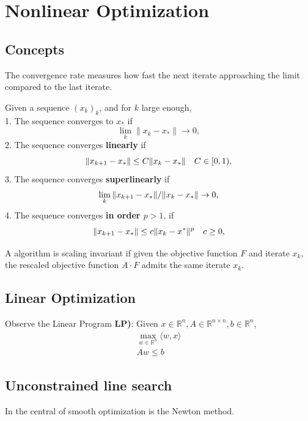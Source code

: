 \chapter{Nonlinear Optimization}
\section{Concepts}
The convergence rate measures how fast the next iterate approaching the limit compared to the last iterate. 
\begin{definition}
	Given a sequence $(x_k)_k$, and for $k$ large enough,\\
	1. The sequence converges to $x_*$ if
	\[ \lim_k \|x_k - x_*\| \rightarrow 0 ,\]
	2. The sequence converges \textbf{linearly} if
	\[ \| x_{k+1} - x_* \| \le C \| x_k - x_*\| \quad C \in [0,1 ) ,\]
	3. The sequence converges \textbf{superlinearly} if 
	\[ \lim_k \| x_{k+1} - x_*\| / \|x_k - x_* \| \rightarrow 0, \]
	4. The sequence converges \textbf{in order $p > 1$}, if 
	\[ \|x_{k+1} - x_*\| \le c \| x_k - x^*\|^p \quad c \ge 0, \]
\end{definition}

\begin{definition}
	
\end{definition}

\begin{definition}
	A algorithm is scaling invariant if given the objective function $F$ and iterate $x_k$, the rescaled objective 
	function $A \cdot F$ admits the same iterate $x_k$. 
\end{definition}


\section{Linear Optimization}
Observe the Linear Program \textbf{LP)}: Given $x \in \mathbb{R}^n, A \in \mathbb{R}^{n \times n}, b \in \mathbb{R}^n$, 
\begin{align*}
	\max_{w \in \mathbb{R}^n} \langle w , x \rangle\\
	Aw \le b
\end{align*}

\section{Unconstrained line search}
In the central of smooth optimization is the Newton method. 

